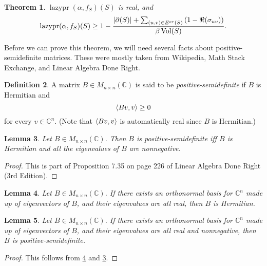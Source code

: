 \documentclass[12pt]{article}
\newtheorem{thm}{Theorem}
\newtheorem{lem}[thm]{Lemma}
\theoremstyle{definition}
\newtheorem{defn}[thm]{Definition}
\newcommand{\C}{\mathbb C}
\DeclarePairedDelimiter\abs{\lvert}{\rvert}
\DeclareMathOperator{\lazypr}{lazypr}
\DeclareMathOperator{\vol}{Vol}
\DeclarePairedDelimiter\inner{\langle}{\rangle}
\begin{document}
\begin{thm}\label{bound on lazy PageRank}
$\lazypr(\alpha, f_S)(S)$ is real, and 
$$
\lazypr(\alpha, f_S)(S) \geq 1 - \frac{\abs*{\partial(S)} + \sum_{(u,v) \in E^{or}(S)}{(1 - \Re(\sigma_{uv}))}}{\beta \vol (S)}.
$$
\end{thm}

Before we can prove this theorem, we will need several facts about positive-semidefinite matrices. These were mostly taken from Wikipedia, Math Stack Exchange, and Linear Algebra Done Right.

\begin{defn}
A matrix $B \in M_{n \times n}(\C)$ is said to be \textit{positive-semidefinite} if $B$ is Hermitian and $$\inner*{ Bv, v } \geq 0$$ for every $v \in \C^n$. (Note that $\inner*{ Bv, v }$ is automatically real since $B$ is Hermitian.)
\end{defn}

\begin{lem}\label{eigenvalue characterization of positive-semidefiniteness}
Let $B \in M_{n \times n}(\C)$. Then $B$ is positive-semidefinite iff $B$ is Hermitian and all the eigenvalues of $B$ are nonnegative.
\end{lem}
\begin{proof}
This is part of Proposition 7.35 on page 226 of Linear Algebra Done Right (3rd Edition).
\end{proof}

\begin{lem}\label{eigenvalue characterization of Hermitian matrix}
Let $B \in M_{n \times n}(\C)$. If there exists an orthonormal basis for $\C^n$ made up of eigenvectors of $B$, and their eigenvalues are all real, then $B$ is Hermitian.
\end{lem}

\begin{lem}\label{eigenvalue condition for positive semidefiniteness}
Let $B \in M_{n \times n}(\C)$. If there exists an orthonormal basis for $\C^n$ made up of eigenvectors of $B$, and their eigenvalues are all real and nonnegative, then $B$ is positive-semidefinite. 
\end{lem}
\begin{proof}
This follows from \cref{eigenvalue characterization of Hermitian matrix} and \cref{eigenvalue characterization of positive-semidefiniteness}.
\end{proof}
\end{document}
